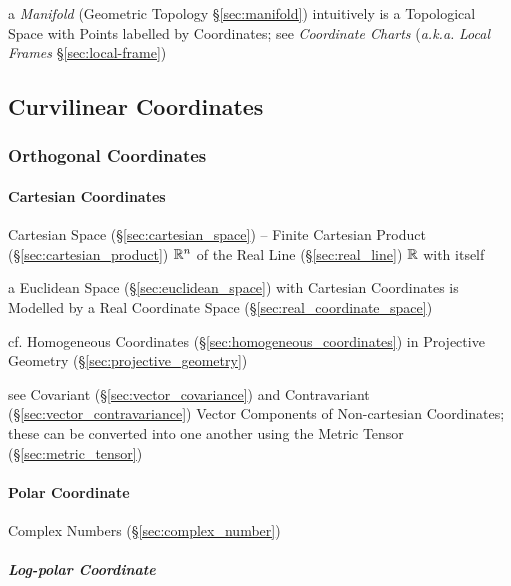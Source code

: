 \fist a \emph{Manifold} (Geometric Topology \S\ref{sec:manifold}) intuitively is
a Topological Space with Points labelled by Coordinates; see \emph{Coordinate
  Charts} (\emph{a.k.a.} \emph{Local Frames} \S\ref{sec:local-frame})



\subsection{Curvilinear Coordinates}\label{sec:curvilinear_coordinates}

\subsubsection{Orthogonal Coordinates}\label{sec:orthogonal_coordinates}

\paragraph{Cartesian Coordinates}\label{sec:cartesian_coordinates}\hfill

Cartesian Space (\S\ref{sec:cartesian_space}) -- Finite Cartesian Product
(\S\ref{sec:cartesian_product}) $\mathbb{R}^n$ of the Real Line
(\S\ref{sec:real_line}) $\mathbb{R}$ with itself

a Euclidean Space (\S\ref{sec:euclidean_space}) with Cartesian Coordinates is
Modelled by a Real Coordinate Space (\S\ref{sec:real_coordinate_space})

cf. Homogeneous Coordinates (\S\ref{sec:homogeneous_coordinates}) in Projective
Geometry (\S\ref{sec:projective_geometry})

see Covariant (\S\ref{sec:vector_covariance}) and Contravariant
(\S\ref{sec:vector_contravariance}) Vector Components of Non-cartesian
Coordinates; these can be converted into one another using the Metric Tensor
(\S\ref{sec:metric_tensor})



\paragraph{Polar Coordinate}\label{sec:polar_coordinates}\hfill

\fist Complex Numbers (\S\ref{sec:complex_number})



\subparagraph{Log-polar Coordinate}\label{sec:logpolar_coordinates}\hfill



